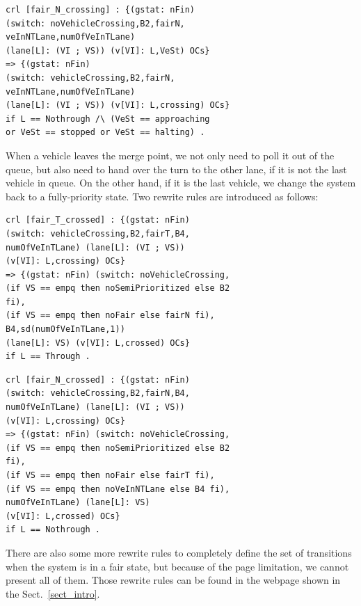 \documentclass[10pt, conference, compsocconf]{IEEEtran}
\begin{document}
\begin{small}
	\begin{verbatim}
crl [fair_N_crossing] : {(gstat: nFin) 
(switch: noVehicleCrossing,B2,fairN,
veInNTLane,numOfVeInTLane) 
(lane[L]: (VI ; VS)) (v[VI]: L,VeSt) OCs} 
=> {(gstat: nFin) 
(switch: vehicleCrossing,B2,fairN,
veInNTLane,numOfVeInTLane) 
(lane[L]: (VI ; VS)) (v[VI]: L,crossing) OCs} 
if L == Nothrough /\ (VeSt == approaching 
or VeSt == stopped or VeSt == halting) .
\end{verbatim}
\end{small}

When a vehicle leaves the merge point, we not only need to poll it out of the queue, but also need to hand over the turn to the other lane, if it is not the last vehicle in queue.
On the other hand, if it is the last vehicle, we change the system back to a fully-priority state.
Two rewrite rules are introduced as follows:

\begin{small}
\begin{verbatim}
crl [fair_T_crossed] : {(gstat: nFin) 
(switch: vehicleCrossing,B2,fairT,B4,
numOfVeInTLane) (lane[L]: (VI ; VS)) 
(v[VI]: L,crossing) OCs} 
=> {(gstat: nFin) (switch: noVehicleCrossing,
(if VS == empq then noSemiPrioritized else B2 
fi), 
(if VS == empq then noFair else fairN fi), 
B4,sd(numOfVeInTLane,1)) 
(lane[L]: VS) (v[VI]: L,crossed) OCs} 
if L == Through .
\end{verbatim}
\end{small}

\begin{small}
	\begin{verbatim}
crl [fair_N_crossed] : {(gstat: nFin) 
(switch: vehicleCrossing,B2,fairN,B4,
numOfVeInTLane) (lane[L]: (VI ; VS)) 
(v[VI]: L,crossing) OCs} 
=> {(gstat: nFin) (switch: noVehicleCrossing,
(if VS == empq then noSemiPrioritized else B2 
fi), 
(if VS == empq then noFair else fairT fi), 
(if VS == empq then noVeInNTLane else B4 fi),
numOfVeInTLane) (lane[L]: VS) 
(v[VI]: L,crossed) OCs} 
if L == Nothrough .
\end{verbatim}
\end{small}

There are also some more rewrite rules to completely define the set of transitions when the system is in a fair state, but because of the page limitation, we cannot present all of them.
Those rewrite rules can be found in the webpage shown in the Sect.~\ref{sect_intro}.
\end{document}
